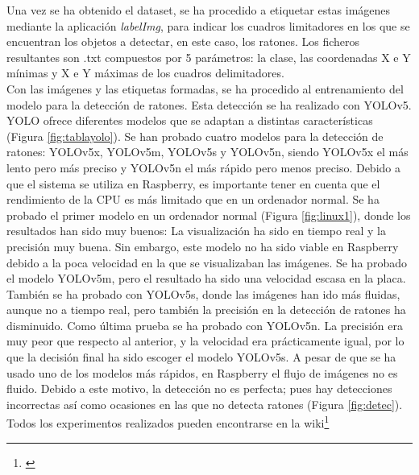 Una vez se ha obtenido el dataset, se ha procedido a etiquetar estas imágenes mediante la aplicación \textit{labelImg}, para indicar los cuadros limitadores en los que se encuentran los objetos a detectar, en este caso, los ratones. Los ficheros resultantes son .txt compuestos por 5 parámetros: la clase, las coordenadas X e Y mínimas y X e Y máximas de los cuadros delimitadores.\\

Con las imágenes y las etiquetas formadas, se ha procedido al entrenamiento del modelo para la detección de ratones. Esta detección se ha realizado con YOLOv5. YOLO ofrece diferentes modelos que se adaptan a distintas características (Figura \ref{fig:tablayolo}). Se han probado cuatro modelos para la detección de ratones: YOLOv5x, YOLOv5m, YOLOv5s y YOLOv5n, siendo YOLOv5x el más lento pero más preciso y YOLOv5n el más rápido pero menos preciso. Debido a que el sistema se utiliza en Raspberry, es importante tener en cuenta que el rendimiento de la CPU es más limitado que en un ordenador normal. Se ha probado el primer modelo en un ordenador normal (Figura \ref{fig:linux1}), donde los resultados han sido muy buenos: La visualización ha sido en tiempo real y la precisión muy buena. Sin embargo, este modelo no ha sido viable en Raspberry debido a la poca velocidad en la que se visualizaban las imágenes. Se ha probado el modelo YOLOv5m, pero el resultado ha sido una velocidad escasa en la placa. También se ha probado con YOLOv5s, donde las imágenes han ido más fluidas, aunque no a tiempo real, pero también la precisión en la detección de ratones ha disminuido. Como última prueba se ha probado con YOLOv5n. La precisión era muy peor que respecto al anterior, y la velocidad era prácticamente igual, por lo que la decisión final ha sido escoger el modelo YOLOv5s. A pesar de que se ha usado uno de los modelos más rápidos, en Raspberry el flujo de imágenes no es fluido. Debido a este motivo, la detección no es perfecta; pues hay detecciones incorrectas así como ocasiones en las que no detecta ratones (Figura \ref{fig:detec}). Todos los experimentos realizados pueden encontrarse en la wiki\footnote{\url{}}\\

